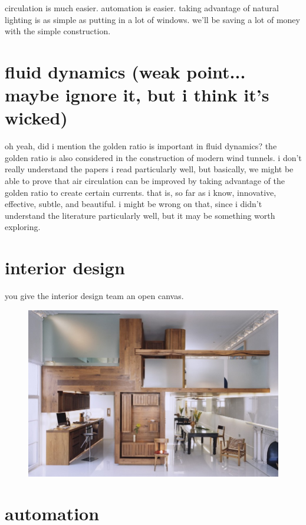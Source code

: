 \documentclass[paper=128mm:96mm, fontsize=9pt, pagesize]{scrartcl}
\begin{document}
circulation is much easier.
automation is easier.
taking advantage of natural lighting is as simple as putting in a lot of windows.
we'll be saving a lot of money with the simple construction.

\section{fluid dynamics (weak point... maybe ignore it, but i think it's wicked)}

oh yeah, did i mention the golden ratio is important in fluid dynamics?
the golden ratio is also considered in the construction of modern wind tunnels.
i don't really understand the papers i read particularly well, but basically, we might be able to prove that air circulation can be improved by taking advantage of the golden ratio to create certain currents.
that is, so far as i know, innovative, effective, subtle, and beautiful.
i might be wrong on that, since i didn't understand the literature particularly well, but it may be something worth exploring.

\clearpage

\section{interior design}

you give the interior design team an open canvas.
\begin{figure}
	\centering
	\includegraphics[height=.6\textheight]{gfx/humblehomespace.jpg}
\end{figure}

\clearpage

\section{automation}
\end{document}
